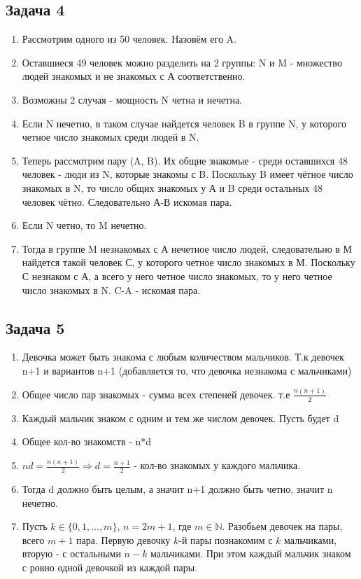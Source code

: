 \documentclass[a4paper,12pt]{article}
\begin{document}
\subsection{Задача 4}
\begin{enumerate}
    \item Рассмотрим одного из 50 человек. Назовём его A. 
    \item Оставшиеся 49 человек можно разделить на 2 группы: N и M - множество людей знакомых и не знакомых с А соответственно.
    \item Возможны 2 случая - мощность N четна и нечетна.
    \item Если N нечетно, в таком случае найдется человек B в группе N, у которого четное число знакомых среди людей в N.
    \item Теперь рассмотрим пару (A, B). Их общие знакомые - среди оставшихся 48 человек - люди из N, которые знакомы с B. Поскольку B имеет чётное число знакомых в N, то число общих знакомых у А и B среди остальных 48 человек чётно. Следовательно А-В искомая пара.
    \item Если N четно, то M нечетно.
    \item Тогда в группе M незнакомых с А нечетное число людей, следовательно в М найдется такой человек С, у которого четное число знакомых в М. Поскольку С незнаком с А, а всего у него четное число знакомых, то у него четное число знакомых в N. C-A - искомая пара.
\end{enumerate}

\subsection{Задача 5}
\begin{enumerate}
    \item Девочка может быть знакома с любым количеством мальчиков. Т.к девочек n+1 и вариантов n+1 (добавляется то, что девочка незнакома с мальчиками)
    \item Общее число пар знакомых - сумма всех степеней девочек. т.е $\frac{n(n+1)}{2}$
    \item Каждый мальчик знаком с одним и тем же числом девочек. Пусть будет d
    \item Общее кол-во знакомств - n*d
    \item $nd=\frac{n(n+1)}{2}\Rightarrow d = \frac{n+1}{2}$ - кол-во знакомых у каждого мальчика.
    \item Тогда d должно быть целым, а значит n+1 должно быть четно, значит n нечетно.
    \item Пусть $k \in \{0, 1, \dots, m\}$, $n = 2m + 1$, где $m \in \mathbb{N}$. Разобьем девочек на пары, всего $m+1$ пара. Первую девочку $k$-й пары познакомим с $k$ мальчиками, вторую - с остальными $n-k$ мальчиками. При этом каждый мальчик знаком с ровно одной девочкой из каждой пары.
\end{enumerate}
\end{document}
